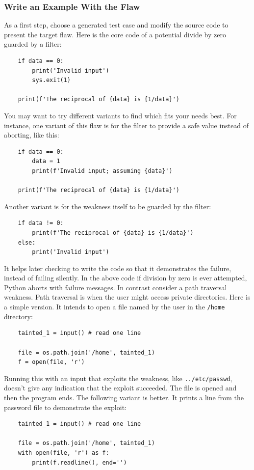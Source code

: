 \subsubsection{Write an Example With the Flaw}

As a first step, choose a generated test case and modify the source code to present
the target flaw.  Here is the core code of
a potential divide by zero guarded by a filter:
\begin{verbatim}
    if data == 0:
        print('Invalid input')
        sys.exit(1)

    print(f'The reciprocal of {data} is {1/data}')
\end{verbatim}
You may want to try different variants to find which fits your needs best.  For
instance, one variant of this flaw is for the filter to provide a safe value instead
of aborting, like this:
\begin{verbatim}
    if data == 0:
        data = 1
        print(f'Invalid input; assuming {data}')

    print(f'The reciprocal of {data} is {1/data}')
\end{verbatim}
Another variant is for the weakness itself to be guarded by the filter:
\begin{verbatim}
    if data != 0:
        print(f'The reciprocal of {data} is {1/data}')
    else:
        print('Invalid input')
\end{verbatim}

It helps later checking to write the code so that it demonstrates the failure,
instead of
failing silently.  In the above code if division by zero is ever attempted, Python
aborts with failure messages.  In contrast consider a path traversal weakness.  Path
traversal is when the user might access private directories.  Here is a simple
version.  It intends to open a file named by the user in the \verb|/home| directory:
\begin{verbatim}
    tainted_1 = input() # read one line

    file = os.path.join('/home', tainted_1)
    f = open(file, 'r')
\end{verbatim}
Running this with an input that exploits the weakness, like
\verb|../etc/passwd|, doesn't give any indication that the exploit succeeded.  The
file is opened and then the program ends.  The following variant is better.  It
prints a line from the password file to demonstrate the exploit:
\begin{verbatim}
    tainted_1 = input() # read one line

    file = os.path.join('/home', tainted_1)
    with open(file, 'r') as f:
        print(f.readline(), end='')
\end{verbatim}


